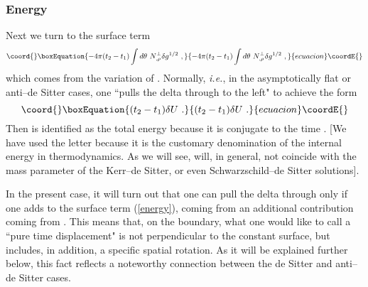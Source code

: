 \documentclass[a4paper,preprintnumbers,amsmath,amssymb]{revtex4}
\begin{document}
\subsubsection*{Energy}

Next we turn to the surface term
\begin{equation}\coord{}\boxEquation{
-4\pi(t_2-t_1)\int d\theta \ N^{\perp}_{,\rho} \delta g^{1/2} \ ,
\label{energy}
}{
-4\pi(t_2-t_1)\int d\theta \ N^{\perp}_{,\rho} \delta g^{1/2} \ ,
}{ecuacion}\coordE{}\end{equation}
which comes from the variation of \coordHE{}. Normally, {\it i.e.},
in the asymptotically flat or anti--de Sitter cases, one ``pulls the delta through to the left" to achieve the form
\begin{equation}\coord{}\boxEquation{
(t_2-t_1) \delta U \ .
\label{e}
}{
(t_2-t_1) \delta U \ .
}{ecuacion}\coordE{}\end{equation}
Then \coordHE{} is identified as the total energy because it is conjugate
to the time \coordHE{}. [We have used the letter \coordHE{} because it is the customary denomination
of the internal energy in thermodynamics. As we will see, \coordHE{} will, in general,
not coincide with the mass parameter \coordHE{} of the Kerr--de Sitter, or even
Schwarzschild--de Sitter solutions].

In the present case, it will turn out that one can pull the delta through only if one adds
to the surface term (\ref{energy}), coming from \coordHE{} an additional contribution coming from \coordHE{}. This means that, on the boundary, what one would like to call a ``pure time displacement" is not perpendicular to the \coordHE{}constant surface, but includes, in addition, a specific spatial rotation. As it will be explained further below, this fact reflects  a noteworthy connection between the de Sitter and anti--de Sitter cases.
\end{document}
